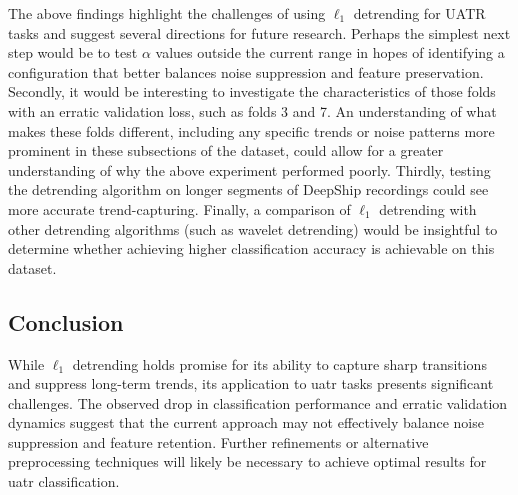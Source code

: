 The above findings highlight the challenges of using $\ell_1$ detrending for UATR tasks and suggest several directions for future research. Perhaps the simplest next step would be to test $\alpha$ values outside the current range in hopes of identifying a configuration that better balances noise suppression and feature preservation. Secondly, it would be interesting to investigate the characteristics of those folds with an erratic validation loss, such as folds 3 and 7. An understanding of what makes these folds different, including any specific trends or noise patterns more prominent in these subsections of the dataset, could allow for a greater understanding of why the above experiment performed poorly. Thirdly, testing the detrending algorithm on longer segments of DeepShip recordings could see more accurate trend-capturing. Finally, a comparison of $\ell_1$ detrending with other detrending algorithms (such as wavelet detrending) would be insightful to determine whether achieving higher classification accuracy is achievable on this dataset.

\subsection{Conclusion}

While $\ell_1$ detrending holds promise for its ability to capture sharp transitions and suppress long-term trends, its application to \acrshort{uatr} tasks presents significant challenges. The observed drop in classification performance and erratic validation dynamics suggest that the current approach may not effectively balance noise suppression and feature retention. Further refinements or alternative preprocessing techniques will likely be necessary to achieve optimal results for \acrshort{uatr} classification.
